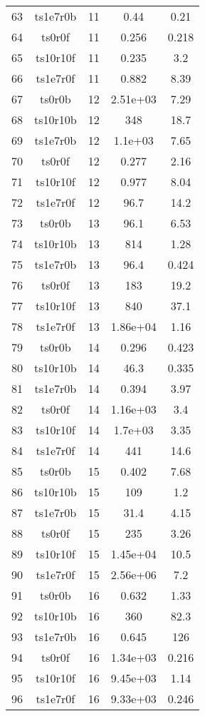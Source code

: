 \begin{table}[hbtp]
\begin{tabular}{|ccccc|}
  63 & ts1e7r0b &   11 & 0.44 & 0.21 \\
  64 & ts0r0f &   11 & 0.256 & 0.218 \\
  65 & ts10r10f &   11 & 0.235 &  3.2 \\
  66 & ts1e7r0f &   11 & 0.882 & 8.39 \\
  67 & ts0r0b &   12 & 2.51e+03 & 7.29 \\
  68 & ts10r10b &   12 &  348 & 18.7 \\
  69 & ts1e7r0b &   12 & 1.1e+03 & 7.65 \\
  70 & ts0r0f &   12 & 0.277 & 2.16 \\
  71 & ts10r10f &   12 & 0.977 & 8.04 \\
  72 & ts1e7r0f &   12 & 96.7 & 14.2 \\
  73 & ts0r0b &   13 & 96.1 & 6.53 \\
  74 & ts10r10b &   13 &  814 & 1.28 \\
  75 & ts1e7r0b &   13 & 96.4 & 0.424 \\
  76 & ts0r0f &   13 &  183 & 19.2 \\
  77 & ts10r10f &   13 &  840 & 37.1 \\
  78 & ts1e7r0f &   13 & 1.86e+04 & 1.16 \\
  79 & ts0r0b &   14 & 0.296 & 0.423 \\
  80 & ts10r10b &   14 & 46.3 & 0.335 \\
  81 & ts1e7r0b &   14 & 0.394 & 3.97 \\
  82 & ts0r0f &   14 & 1.16e+03 &  3.4 \\
  83 & ts10r10f &   14 & 1.7e+03 & 3.35 \\
  84 & ts1e7r0f &   14 &  441 & 14.6 \\
  85 & ts0r0b &   15 & 0.402 & 7.68 \\
  86 & ts10r10b &   15 &  109 &  1.2 \\
  87 & ts1e7r0b &   15 & 31.4 & 4.15 \\
  88 & ts0r0f &   15 &  235 & 3.26 \\
  89 & ts10r10f &   15 & 1.45e+04 & 10.5 \\
  90 & ts1e7r0f &   15 & 2.56e+06 &  7.2 \\
  91 & ts0r0b &   16 & 0.632 & 1.33 \\
  92 & ts10r10b &   16 &  360 & 82.3 \\
  93 & ts1e7r0b &   16 & 0.645 &  126 \\
  94 & ts0r0f &   16 & 1.34e+03 & 0.216 \\
  95 & ts10r10f &   16 & 9.45e+03 & 1.14 \\
  96 & ts1e7r0f &   16 & 9.33e+03 & 0.246 \\
\hline
\end{tabular}
\end{table}
